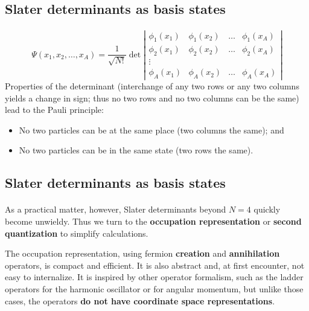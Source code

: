\documentclass[%
twoside,                 %
final,                   %
10pt]{article}
\begin{document}
\subsection*{Slater determinants as basis states}

\paragraph{}
\[
\Psi(x_1, x_2, \ldots, x_A) 
= \frac{1}{\sqrt{N!}} 
\det \left | 
\begin{array}{cccc}
\phi_1(x_1) & \phi_1(x_2) & \ldots & \phi_1(x_A) \\
\phi_2(x_1) & \phi_2(x_2) & \ldots & \phi_2(x_A) \\
 \vdots & & &  \\
\phi_A(x_1) & \phi_A(x_2) & \ldots & \phi_A(x_A) 
\end{array}
\right |
\]
Properties of the determinant (interchange of any two rows or 
any two columns yields a change in sign; thus no two rows and no 
two columns can be the same) lead to the Pauli principle:

\begin{itemize}
\item No two particles can be at the same place (two columns the same); and

\item No two particles can be in the same state (two rows the same).
\end{itemize}

\noindent




\subsection*{Slater determinants as basis states}

\paragraph{}
As a practical matter, however, Slater determinants beyond $N=4$ quickly become 
unwieldy. Thus we turn to the \textbf{occupation representation} or \textbf{second quantization} to simplify calculations. 

The occupation representation, using fermion \textbf{creation} and \textbf{annihilation} 
operators, is compact and efficient. It is also abstract and, at first encounter, not easy to 
internalize. It is inspired by other operator formalism, such as the ladder operators for 
the harmonic oscillator or for angular momentum, but unlike those cases, the operators \textbf{do not have coordinate space representations}.
\end{document}
